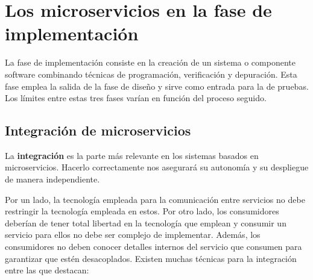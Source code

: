 \documentclass[11pt,spanish,listoffigures]{tfgetsinf}
\begin{document}
\section{Los microservicios en la fase de implementación}

La fase de implementación consiste en la creación de un sistema o componente software combinando técnicas de programación, verificación y depuración. Esta fase emplea la salida de la fase de diseño y sirve como entrada para la de pruebas. Los límites entre estas tres fases varían en función del proceso seguido. \cite{Bourque2014}

\subsection{Integración de microservicios} \label{subsect:Integracion}

La \textbf{integración} es la parte más relevante en los sistemas basados en microservicios. Hacerlo correctamente nos asegurará su autonomía y su despliegue de manera independiente.

Por un lado, la tecnología empleada para la comunicación entre servicios no debe restringir la tecnología empleada en estos. Por otro lado, los consumidores deberían de tener total libertad en la tecnología que emplean y consumir un servicio para ellos no debe ser complejo de implementar. Además, los consumidores no deben conocer detalles internos del servicio que consumen para garantizar que estén desacoplados. \cite{Newman2015a} Existen muchas técnicas para la integración entre las que destacan: 
\end{document}
